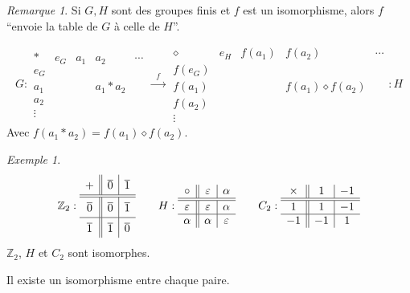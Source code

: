 \documentclass{report}
\newcommand*{\entiers}{\mathbb{Z}}
\theoremstyle{definition}
\theoremstyle{remark}
\newtheorem*{exem}{Exemple}
\newtheorem*{rema}{Remarque}
\begin{document}
	\begin{rema}
		Si $G,H$ sont des groupes finis et $f$ est un isomorphisme, alors $f$ ``envoie la table de $G$ \`a celle de $H$''.

		\[
		G:
		\begin{array}{c||c|c|c|c}
			*&e_G&a_1&a_2&\dotsb\\
			\hline\hline
			e_G&&&&\\
			\hline
			a_1&&&a_1*a_2&\\
			\hline
			a_2&&&&\\
			\hline
			\vdots&&&&
		\end{array}
		\xrightarrow{~~~f~~~}
		\begin{array}{c||c|c|c|c}
			\diamond&e_H&f(a_1)&f(a_2)&\dotsb\\
			\hline\hline
			f(e_G)&&&&\\
			\hline
			f(a_1)&&&f(a_1) \diamond f(a_2)&\\
			\hline
			f(a_2)&&&&\\
			\hline
			\vdots&&&&
		\end{array}
		:H
		\]
		Avec $f(a_1*a_2)=f(a_1) \diamond f(a_2)$.
		\begin{exem}
			\[
			\entiers_2:
			\renewcommand{\arraystretch}{1.5}
			\begin{array}{c||c|c}
				+&\overline0&\overline1\\
				\hline\hline
				\overline0&\overline0&\overline1\\
				\hline
				\overline1&\overline1&\overline0
			\end{array}
			\renewcommand{\arraystretch}{1}
			\qquad
			H:
			\begin{array}{c||c|c}
				\circ&\varepsilon&\alpha\\
				\hline\hline
				\varepsilon&\varepsilon&\alpha\\
				\hline
				\alpha&\alpha&\varepsilon
			\end{array}
			\qquad
			C_2:
			\begin{array}{c||c|c}
				\times&1&-1\\
				\hline\hline
				1&1&-1\\
				\hline
				-1&-1&1
			\end{array}
			\]
			$\entiers_2$, $H$ et $C_2$ sont isomorphes.

			Il existe un isomorphisme entre chaque paire.
		\end{exem}
	\end{rema}
\end{document}
